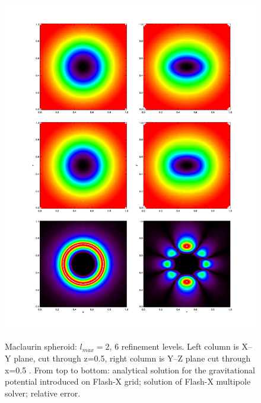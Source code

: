\begin{figure}
\begin{center}
{\leavevmode\includegraphics[width=140mm]{Maclaurin_mpole2}}
\end{center}
\caption{Maclaurin spheroid: $l_{max} = 2$, 6 refinement levels. Left column is X--Y plane, 
                cut through z=0.5, right column is Y--Z plane cut through x=0.5 . 
                From top to bottom: analytical solution for the gravitational potential introduced on 
                Flash-X grid; solution of Flash-X multipole solver; relative error.}
\label{Fig:Maclaurin_mpole2}
\end{figure}



